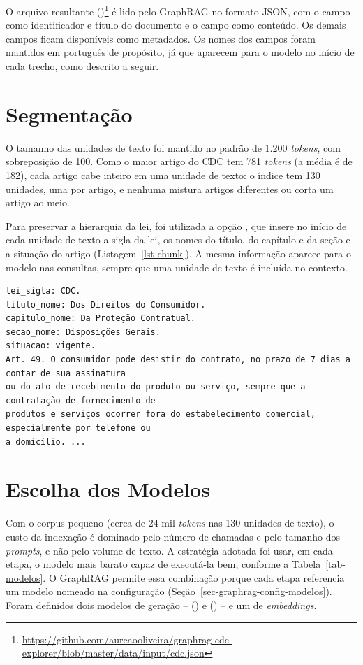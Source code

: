 O arquivo resultante ()\footnote{\url{https://github.com/aureaooliveira/graphrag-cdc-explorer/blob/master/data/input/cdc.json}} é lido pelo GraphRAG no formato JSON, com o campo  como identificador e título do documento e o campo  como conteúdo. Os demais campos ficam disponíveis como metadados. Os nomes dos campos foram mantidos em português de propósito, já que aparecem para o modelo no início de cada trecho, como descrito a seguir.

\section{Segmentação}
\label{sec-indexacao-segmentacao}

O tamanho das unidades de texto foi mantido no padrão de 1.200 \textit{tokens}, com sobreposição de 100. Como o maior artigo do CDC tem 781 \textit{tokens} (a média é de 182), cada artigo cabe inteiro em uma unidade de texto: o índice tem 130 unidades, uma por artigo, e nenhuma mistura artigos diferentes ou corta um artigo ao meio.

Para preservar a hierarquia da lei, foi utilizada a opção , que insere no início de cada unidade de texto a sigla da lei, os nomes do título, do capítulo e da seção e a situação do artigo (Listagem~\ref{lst-chunk}). A mesma informação aparece para o modelo nas consultas, sempre que uma unidade de texto é incluída no contexto.

\begin{lstlisting}[caption={Início de uma unidade de texto, com os metadados inseridos pelo \code{prepend\_metadata}.}, label=lst-chunk]
lei_sigla: CDC.
titulo_nome: Dos Direitos do Consumidor.
capitulo_nome: Da Proteção Contratual.
secao_nome: Disposições Gerais.
situacao: vigente.
Art. 49. O consumidor pode desistir do contrato, no prazo de 7 dias a contar de sua assinatura
ou do ato de recebimento do produto ou serviço, sempre que a contratação de fornecimento de
produtos e serviços ocorrer fora do estabelecimento comercial, especialmente por telefone ou
a domicílio. ...
\end{lstlisting}

\section{Escolha dos Modelos}
\label{sec-indexacao-modelos}

Com o corpus pequeno (cerca de 24 mil \textit{tokens} nas 130 unidades de texto), o custo da indexação é dominado pelo número de chamadas e pelo tamanho dos \textit{prompts}, e não pelo volume de texto. A estratégia adotada foi usar, em cada etapa, o modelo mais barato capaz de executá-la bem, conforme a Tabela~\ref{tab-modelos}. O GraphRAG permite essa combinação porque cada etapa referencia um modelo nomeado na configuração (Seção~\ref{sec-graphrag-config-modelos}). Foram definidos dois modelos de geração --  () e  () -- e um de \textit{embeddings}.

